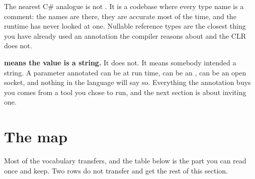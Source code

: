 \begin{csbox}
The nearest C\# analogue is not . It is a codebase where every
type name is a comment: the names are there, they are accurate most of the
time, and the runtime has never looked at one. Nullable reference types are
the closest thing you have already used \dash{} an annotation the compiler
reasons about and the CLR does not.
\end{csbox}

\begin{trapbox}
\textbf{ means the value is a string.} It does not. It means
somebody intended a string. A parameter annotated  can be
 at run time, can be an , can be an open socket, and
nothing in the language will say so. Everything the annotation buys you comes
from a tool you chose to run, and the next section is about inviting one.
\end{trapbox}


\section{The map}
\label{sec:ch03-map}

Most of the vocabulary transfers, and the table below is the part you can
read once and keep. Two rows do not transfer and get the rest of this
section.

